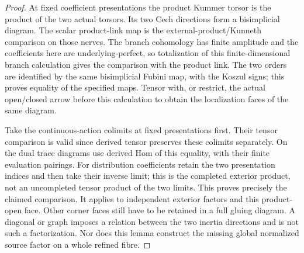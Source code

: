 \documentclass[11pt]{article}
\theoremstyle{definition}
\theoremstyle{remark}
\begin{document}
\begin{proof}
At fixed coefficient presentations the product Kummer torsor is
the product of the two actual torsors.  Its two Cech directions
form a bisimplicial diagram.  The scalar product-link map is the
external-product/Kunneth comparison on those nerves.  The branch
cohomology has finite amplitude and the coefficients here are
underlying-perfect, so totalization of this finite-dimensional
branch calculation gives the comparison with the product link.
The two orders are identified by the same bisimplicial Fubini map,
with the Koszul signs; this proves equality of the specified maps.
Tensor with, or restrict, the actual open/closed arrow before this
calculation to obtain the localization faces of the same diagram.

Take the continuous-action colimits at fixed presentations first.
Their tensor comparison is valid since derived tensor preserves
these colimits separately.  On the dual trace diagrams use derived
Hom of this equality, with their finite evaluation pairings.
For distribution coefficients retain the two presentation indices
and then take their inverse limit; this is the completed exterior
product, not an uncompleted tensor product of the two limits.
This proves precisely the claimed comparison.  It applies to
independent exterior factors and this product-open face.  Other
corner faces still have to be retained in a full gluing diagram.
A diagonal or graph imposes a
relation between the two inertia directions and is not such a
factorization.  Nor does this lemma construct the missing global
normalized source factor on a whole refined fibre.
\end{proof}
\end{document}
